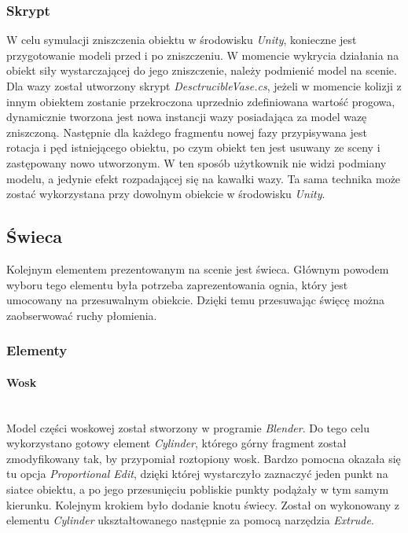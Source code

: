 \subsubsection{Skrypt}
W celu symulacji zniszczenia obiektu w środowisku \textit{Unity}, konieczne jest przygotowanie modeli przed i po zniszczeniu. W momencie wykrycia działania na obiekt siły wystarczającej do jego zniszczenie, należy podmienić model na scenie. \\
Dla wazy został utworzony skrypt \textit{DesctrucibleVase.cs}, jeżeli w momencie kolizji z innym obiektem zostanie przekroczona uprzednio zdefiniowana wartość progowa, dynamicznie tworzona jest nowa instancji wazy posiadająca za model wazę zniszczoną. Następnie dla każdego fragmentu nowej fazy przypisywana jest rotacja i pęd istniejącego obiektu, po czym obiekt ten jest usuwany ze sceny i zastępowany nowo utworzonym. W ten sposób użytkownik nie widzi podmiany modelu, a jedynie efekt rozpadającej się na kawałki wazy. Ta sama technika może zostać wykorzystana przy dowolnym obiekcie w środowisku \textit{Unity}.

\subsection{Świeca}
Kolejnym elementem prezentowanym na scenie jest świeca. Głównym powodem wyboru tego elementu była potrzeba zaprezentowania ognia, który jest umocowany na przesuwalnym obiekcie. Dzięki temu przesuwając święcę można zaobserwować ruchy płomienia.

\subsubsection{Elementy}
\paragraph{Wosk}
\mbox{}\\
Model części woskowej został stworzony w programie \textit{Blender}. Do tego celu wykorzystano gotowy element \textit{Cylinder}, którego górny fragment został zmodyfikowany tak, by przypomiał roztopiony wosk. Bardzo pomocna okazała się tu opcja \textit{Proportional Edit}, dzięki której wystarczyło zaznaczyć jeden punkt na siatce obiektu, a po jego przesunięciu pobliskie punkty podążały w tym samym kierunku. Kolejnym krokiem było dodanie knotu świecy. Został on wykonowany z elementu \textit{Cylinder} ukształtowanego następnie za pomocą narzędzia \textit{Extrude}.

